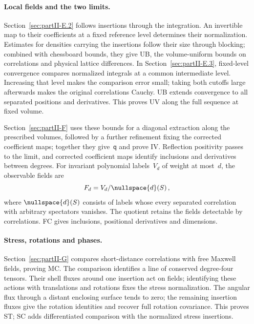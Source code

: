 \paragraph{Local fields and the two limits.}
Section~\ref{sec:partII-E.2} follows insertions through the integration. An invertible map to their coefficients at a fixed reference level determines their normalization. Estimates for densities carrying the insertions follow their size through blocking; combined with chessboard bounds, they give UB, the volume-uniform bounds on correlations and physical lattice differences. In Section~\ref{sec:partII-E.3}, fixed-level convergence compares normalized integrals at a common intermediate level. Increasing that level makes the comparison error small; taking both cutoffs large afterwards makes the original correlations Cauchy. UB extends convergence to all separated positions and derivatives. This proves UV along the full sequence at fixed volume.

Section~\ref{sec:partII-F} uses these bounds for a diagonal extraction along the prescribed volumes, followed by a further refinement fixing the corrected coefficient maps; together they give~$\mathsf q$ and prove IV. Reflection positivity passes to the limit, and corrected coefficient maps identify inclusions and derivatives between degrees. For invariant polynomial labels~$V_d$ of weight at most~$d$, the observable fields are
\begin{equation*}
F_d=V_d/\nullspace{d}(S)\,,
\end{equation*}
where $\nullspace{d}(S)$ consists of labels whose every separated correlation with arbitrary spectators vanishes. The quotient retains the fields detectable by correlations. FC gives inclusions, positional derivatives and dimensions.

\paragraph{Stress, rotations and phases.}
Section~\ref{sec:partII-G} compares short-distance correlations with free Maxwell fields, proving MC. The comparison identifies a line of conserved degree-four tensors. Their shell fluxes around one insertion act on fields; identifying these actions with translations and rotations fixes the stress normalization. The angular flux through a distant enclosing surface tends to zero; the remaining insertion fluxes give the rotation identities and recover full rotation covariance. This proves ST; SC adds differentiated comparison with the normalized stress insertions.

